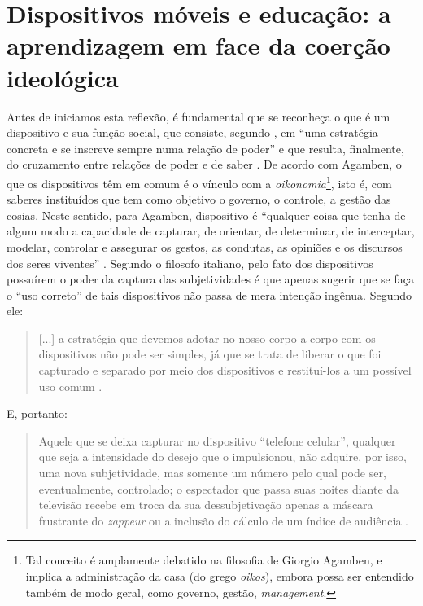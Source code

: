 \documentclass[portuguese]{textolivre}
\begin{document}
\section{Dispositivos móveis e educação: a aprendizagem em face da coerção ideológica}\label{sec-formato}
Antes de iniciamos esta reflexão, é fundamental que se reconheça o que é um dispositivo e sua função social, que consiste, segundo \textcite{agamben_o_2010}, em “uma estratégia concreta e se inscreve sempre numa relação de poder” e que resulta, finalmente, do cruzamento entre relações de poder e de saber \cite[p. 29]{agamben_o_2010}. De acordo com Agamben, o que os dispositivos têm em comum é o vínculo com a \textit{oikonomia}\footnote{Tal conceito é amplamente debatido na filosofia de Giorgio Agamben, e implica a administração da casa (do grego \textit{oikos}), embora possa ser entendido também de modo geral, como governo, gestão, \textit{management}.}, isto é, com saberes instituídos que tem como objetivo o governo, o controle, a gestão das cosias. Neste sentido, para Agamben, dispositivo é “qualquer coisa que tenha de algum modo a capacidade de capturar, de orientar, de determinar, de interceptar, modelar, controlar e assegurar os gestos, as condutas, as opiniões e os discursos dos seres viventes” \cite[p. 40]{agamben_o_2010}. Segundo o filosofo italiano, pelo fato dos dispositivos possuírem o poder da captura das subjetividades é que apenas sugerir que se faça o “uso correto” de tais dispositivos não passa de mera intenção ingênua. Segundo ele:

\begin{quote}
    [...] a estratégia que devemos adotar no nosso corpo a corpo com os dispositivos não pode ser simples, já que se trata de liberar o que foi capturado e separado por meio dos dispositivos e restituí-los a um possível uso comum \cite[p. 44]{agamben_o_2010}.
\end{quote}

E, portanto:
\begin{quote}
    Aquele que se deixa capturar no dispositivo “telefone celular”, qualquer que seja a intensidade do desejo que o impulsionou, não adquire, por isso, uma nova subjetividade, mas somente um número pelo qual pode ser, eventualmente, controlado; o espectador que passa suas noites diante da televisão recebe em troca da sua dessubjetivação apenas a máscara frustrante do \textit{zappeur} ou a inclusão do cálculo de um índice de audiência \cite[p. 48]{agamben_o_2010}.
\end{quote}
\end{document}
